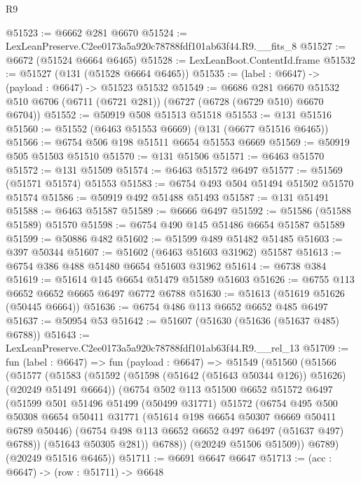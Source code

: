 \begin{lexlean}{R9}
\begin{coremodule}
@51523 := @6662 @281 @6670
@51524 := LexLeanPreserve.C2ee0173a5a920c78788fdf101ab63f44.R9.__fits_8
@51527 := @6672 (@51524 @6664 @6465)
@51528 := LexLeanBoot.ContentId.frame
@51532 := @51527 (@131 (@51528 @6664 @6465))
@51535 := (label : @6647) -> (payload : @6647) -> @51523 @51532
@51549 := @6686
    @281
    @6670
    @51532
    @510
    @6706
    (@6711 (@6721 @281))
    (@6727 (@6728 (@6729 @510) @6670 @6704))
@51552 := @50919 @508 @51513 @51518
@51553 := @131 @51516
@51560 := @51552 (@6463 @51553 @6669) (@131 (@6677 @51516 @6465))
@51566 := @6754 @506 @198 @51511 @6654 @51553 @6669
@51569 := @50919 @505 @51503 @51510
@51570 := @131 @51506
@51571 := @6463 @51570
@51572 := @131 @51509
@51574 := @6463 @51572 @6497
@51577 := @51569 (@51571 @51574) @51553
@51583 := @6754 @493 @504 @51494 @51502 @51570 @51574
@51586 := @50919 @492 @51488 @51493
@51587 := @131 @51491
@51588 := @6463 @51587
@51589 := @6666 @6497
@51592 := @51586 (@51588 @51589) @51570
@51598 := @6754 @490 @145 @51486 @6654 @51587 @51589
@51599 := @50886 @482
@51602 := @51599 @489 @51482 @51485
@51603 := @397 @50344
@51607 := @51602 (@6463 @51603 @31962) @51587
@51613 := @6754 @386 @488 @51480 @6654 @51603 @31962
@51614 := @6738 @384
@51619 := @51614 @145 @6654 @51479 @51589 @51603
@51626 := @6755 @113 @6652 @6652 @6665 @6497 @6772 @6788
@51630 := @51613 (@51619 @51626 (@50445 @6664))
@51636 := @6754 @486 @113 @6652 @6652 @485 @6497
@51637 := @50954 @53
@51642 := @51607 (@51630 (@51636 (@51637 @485) @6788))
@51643 := LexLeanPreserve.C2ee0173a5a920c78788fdf101ab63f44.R9.__rel_13
@51709 := fun (label : @6647) =>
  fun (payload : @6647) =>
  @51549
    (@51560
      (@51566
        (@51577
          (@51583
            (@51592 (@51598 (@51642 (@51643 @50344 @126)) @51626) (@20249 @51491 @6664))
            (@6754
              @502
              @113
              @51500
              @6652
              @51572
              @6497
              (@51599
                @501
                @51496
                @51499
                (@50499 @31771)
                @51572
                (@6754
                  @495
                  @500
                  @50308
                  @6654
                  @50411
                  @31771
                  (@51614 @198 @6654 @50307 @6669 @50411 @6789 @50446)
                  (@6754 @498 @113 @6652 @6652 @497 @6497 (@51637 @497) @6788))
                (@51643 @50305 @281))
              @6788))
          (@20249 @51506 @51509))
        @6789)
      (@20249 @51516 @6465))
@51711 := @6691 @6647 @6647
@51713 := (acc : @6647) -> (row : @51711) -> @6648

\end{coremodule}
\end{lexlean}
